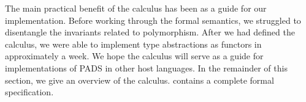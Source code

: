 {The main practical benefit of the calculus has been as a guide for our
implementation. Before working through the formal semantics, we
struggled to disentangle the invariants related to polymorphism. After
we had defined the calculus, we were able to implement type
abstractions as \ocaml{} functors in approximately a week.  We hope
the calculus will serve as a guide for implementations of {\sc PADS} in
other host languages.
In the remainder of this section, we give an overview of the calculus.
 contains a complete formal specification.





}
